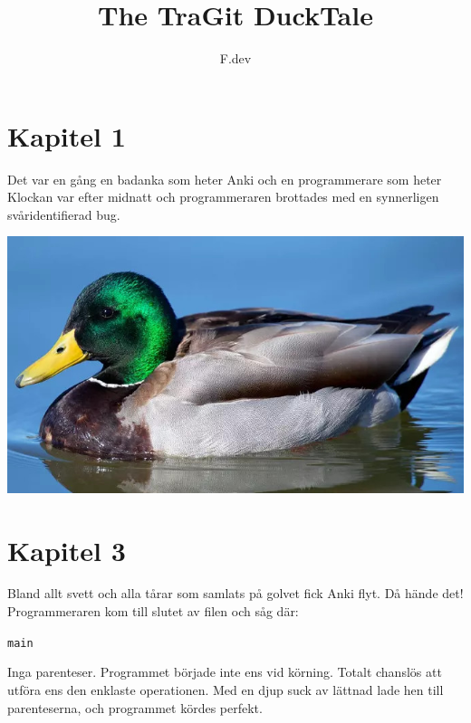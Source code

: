 \documentclass[a4paper]{article}
\begin{document}
\title{The TraGit DuckTale}
\author{F.dev}
\maketitle

\section*{Kapitel 1}
Det var en gång en badanka som heter Anki och en programmerare som heter %
Klockan var efter midnatt och programmeraren brottades med en synnerligen svåridentifierad bug.

\begin{center}
	\includegraphics[scale=0.3]{duck_that_is_not_anki.jpeg}
\end{center}


\section*{Kapitel 3}
Bland allt svett och alla tårar som samlats på golvet fick Anki flyt. Då hände det! Programmeraren kom till slutet av filen och såg där:

\texttt{main}

Inga parenteser. Programmet började inte ens vid körning. Totalt chanslös att utföra ens den enklaste operationen. Med en djup suck av lättnad lade hen till parenteserna, och programmet kördes perfekt.
\end{document}
